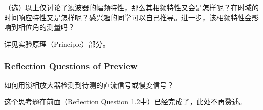 \begin{question}
	（选）以上仅讨论了滤波器的幅频特性，那么其相频特性又会是怎样呢？在时域的时间响应特性又是怎样呢？感兴趣的同学可以自己推导。进一步，该相频特性会影响到相位角的测量吗？
\end{question}
详见实验原理（Principle）部分。

\subsubsection{Reflection Questions of Preview}

\begin{question}
	如何用锁相放大器检测到待测的直流信号或慢变信号？
\end{question}
这个思考题在前面（Reflection Question 1.2中）已经完成了，此处不再赘述。


